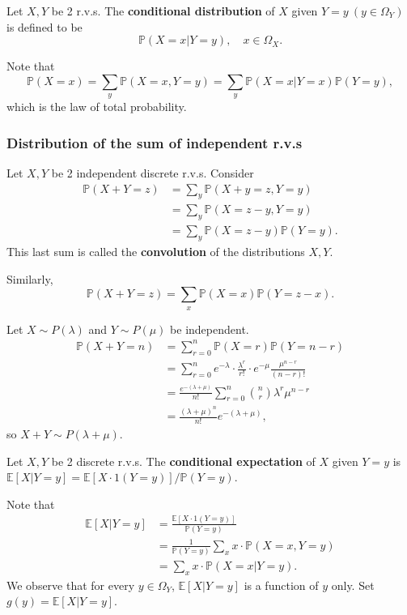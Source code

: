 \begin{definition}
    Let $X,Y$ be 2 r.v.s. The \textbf{conditional distribution} of $X$ given $ Y=y\ (y\in \Omega_Y) $ is defined to be 
    \[
        \mathbb{P}(X=x|Y=y),\quad x\in \Omega_X.
    \]
\end{definition}
Note that 
\[
    \mathbb{P}(X=x) = \sum_{y} \mathbb{P}(X=x,Y=y) = \sum_{y} \mathbb{P}(X=x|Y=x)\mathbb{P}(Y=y),
\]
which is the law of total probability.
\subsubsection*{Distribution of the sum of independent r.v.s}
Let $ X,Y $ be 2 independent discrete r.v.s. Consider 
\begin{align*}
    \mathbb{P}(X+Y=z) &= \sum_{y} \mathbb{P}(X+y=z,Y=y)\\ 
    &= \sum_{y} \mathbb{P}(X=z-y,Y=y)\\ 
    &= \sum_{y} \mathbb{P}(X=z-y)\mathbb{P}(Y=y).
\end{align*}
This last sum is called the \textbf{convolution} of the distributions $X,Y$.

Similarly,
\[
    \mathbb{P}(X+Y=z)=\sum_{x} \mathbb{P}(X=x)\mathbb{P}(Y=z-x).
\]
\begin{example}
    Let $ X \sim P(\lambda) $ and $ Y \sim P(\mu) $ be independent.
    \begin{align*}
        \mathbb{P}(X+Y=n)&= \sum_{r=0}^{n}\mathbb{P}(X=r)\mathbb{P}(Y=n-r)\\ 
        &= \sum_{r=0}^{n}e^{-\lambda}\cdot \frac{\lambda^r}{r!}\cdot e^{-\mu}\frac{\mu^{n-r}}{(n-r)!}\\ 
        &= \frac{e^{-(\lambda+\mu)}}{n!}\sum_{r=0}^{n} \binom{n}{r} \lambda^r \mu^{n-r}\\ 
        &= \frac{(\lambda+\mu)^n}{n!}e^{-(\lambda+\mu)},
    \end{align*}
    so $ X+Y \sim P(\lambda+\mu) $.
\end{example}
\begin{definition}
    Let $ X,Y $ be 2 discrete r.v.s. The \textbf{conditional expectation} of $X$ given $Y=y$ is $ \mathbb{E}[X|Y=y]=\mathbb{E}[X\cdot 1(Y=y)]/\mathbb{P}(Y=y) $.
\end{definition}
Note that 
\begin{align*}
    \mathbb{E}[X|Y=y] &= \frac{\mathbb{E}[X\cdot 1(Y=y)]}{\mathbb{P}(Y=y)}\\
     &= \frac{1}{\mathbb{P}(Y=y)}\sum_{x} x \cdot \mathbb{P}(X=x,Y=y)
     \\ &= \sum_{x} x \cdot \mathbb{P}(X=x|Y=y).
\end{align*}
We observe that for every $y\in \Omega_Y$, $\mathbb{E}[X|Y=y]$ is a function of $y$ only. Set $ g(y)=\mathbb{E}[X|Y=y] $.

